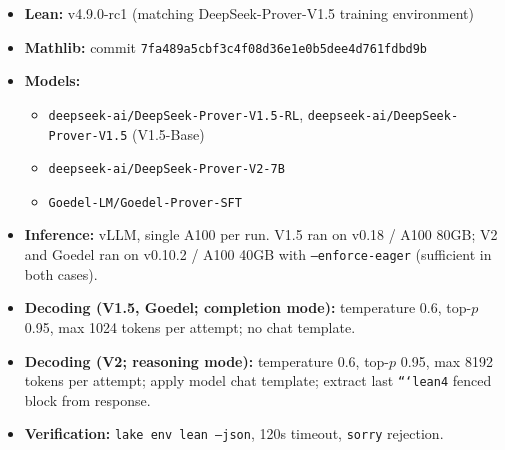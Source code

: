\documentclass{article}
\begin{document}
\begin{itemize}
\item \textbf{Lean:} v4.9.0-rc1 (matching DeepSeek-Prover-V1.5 training environment)
\item \textbf{Mathlib:} commit \texttt{7fa489a5cbf3c4f08d36e1e0b5dee4d761fdbd9b}
\item \textbf{Models:}
  \begin{itemize}
    \item \texttt{deepseek-ai/DeepSeek-Prover-V1.5-RL}, \texttt{deepseek-ai/DeepSeek-Prover-V1.5} (V1.5-Base)
    \item \texttt{deepseek-ai/DeepSeek-Prover-V2-7B}
    \item \texttt{Goedel-LM/Goedel-Prover-SFT}
  \end{itemize}
\item \textbf{Inference:} vLLM, single A100 per run. V1.5 ran on v0.18 / A100 80GB; V2 and Goedel ran on v0.10.2 / A100 40GB with \texttt{--enforce-eager} (sufficient in both cases).
\item \textbf{Decoding (V1.5, Goedel; completion mode):} temperature 0.6, top-$p$ 0.95, max 1024 tokens per attempt; no chat template.
\item \textbf{Decoding (V2; reasoning mode):} temperature 0.6, top-$p$ 0.95, max 8192 tokens per attempt; apply model chat template; extract last \texttt{```lean4} fenced block from response.
\item \textbf{Verification:} \texttt{lake env lean --json}, 120s timeout, \texttt{sorry} rejection.
\end{itemize}



\end{document}
